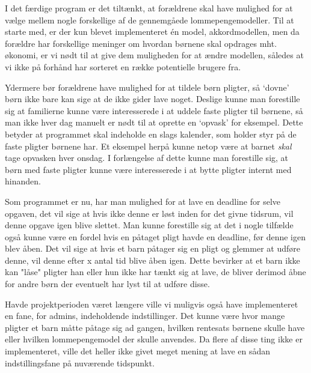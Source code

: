 I det færdige program er det tiltænkt, at forældrene skal have mulighed for at vælge mellem nogle forskellige af de gennemgåede lommepengemodeller. Til at starte med, er der kun blevet implementeret én model, akkordmodellen, men da forældre har forskellige meninger om hvordan børnene skal opdrages mht. økonomi, er vi nødt til at give dem muligheden for at ændre modellen, således at vi ikke på forhånd har sorteret en række potentielle brugere fra.

Ydermere bør forældrene have mulighed for at tildele børn pligter, så ‘dovne’ børn ikke bare kan sige at de ikke gider lave noget. Deslige kunne man forestille sig at familierne kunne være interesserede i at uddele faste pligter til børnene, så man ikke hver dag manuelt er nødt til at oprette en ‘opvask’ for eksempel. Dette betyder at programmet skal indeholde en slags kalender, som holder styr på de faste pligter børnene har. Et eksempel herpå kunne netop være at barnet \textit{skal} tage opvasken hver onsdag. I forlængelse af dette kunne man forestille sig, at børn med faste pligter kunne være interesserede i at bytte pligter internt med hinanden.

Som programmet er nu, har man mulighed for at lave en deadline for selve opgaven, det vil sige at hvis ikke denne er løst inden for det givne tidsrum, vil denne opgave igen blive slettet. Man kunne forestille sig at det i nogle tilfælde også kunne være en fordel hvis en påtaget pligt havde en deadline, før denne igen blev åben. Det vil sige at hvis et barn påtager sig en pligt og glemmer at udføre denne, vil denne efter x antal tid blive åben igen. Dette bevirker at et barn ikke kan "låse" pligter han eller hun ikke har tænkt sig at lave, de bliver derimod åbne for andre børn der eventuelt har lyst til at udføre disse.

Havde projektperioden været længere ville vi muligvis også have implementeret en fane, for admins, indeholdende indstillinger. Det kunne være hvor mange pligter et barn måtte påtage sig ad gangen, hvilken rentesats børnene skulle have eller hvilken lommepengemodel der skulle anvendes. Da flere af disse ting ikke er implementeret, ville det heller ikke givet meget mening at lave en sådan indstillingsfane på nuværende tidspunkt.